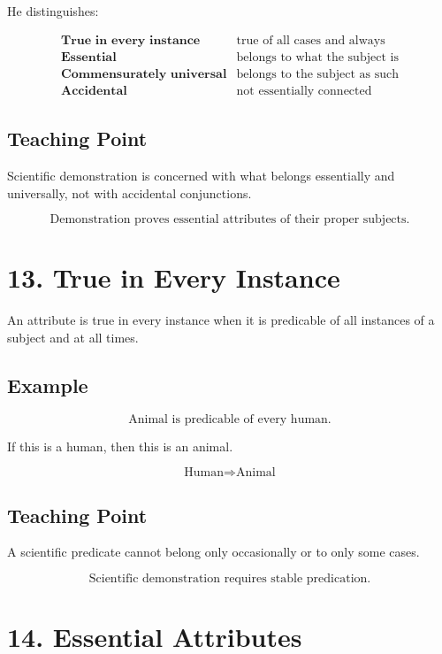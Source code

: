 \documentclass[12pt]{article}
\begin{document}
He distinguishes:

\[
\begin{array}{ll}
\textbf{True in every instance} & \text{true of all cases and always} \\
\textbf{Essential} & \text{belongs to what the subject is} \\
\textbf{Commensurately universal} & \text{belongs to the subject as such} \\
\textbf{Accidental} & \text{not essentially connected}
\end{array}
\]

\subsection*{Teaching Point}

Scientific demonstration is concerned with what belongs essentially and
universally, not with accidental conjunctions.

\[
\boxed{
\text{Demonstration proves essential attributes of their proper subjects.}
}
\]

\section*{13. True in Every Instance}

An attribute is true in every instance when it is predicable of all instances of
a subject and at all times.

\subsection*{Example}

\[
\text{Animal is predicable of every human.}
\]

If this is a human, then this is an animal.

\[
\text{Human} \Rightarrow \text{Animal}
\]

\subsection*{Teaching Point}

A scientific predicate cannot belong only occasionally or to only some cases.

\[
\boxed{
\text{Scientific demonstration requires stable predication.}
}
\]

\section*{14. Essential Attributes}
\end{document}
